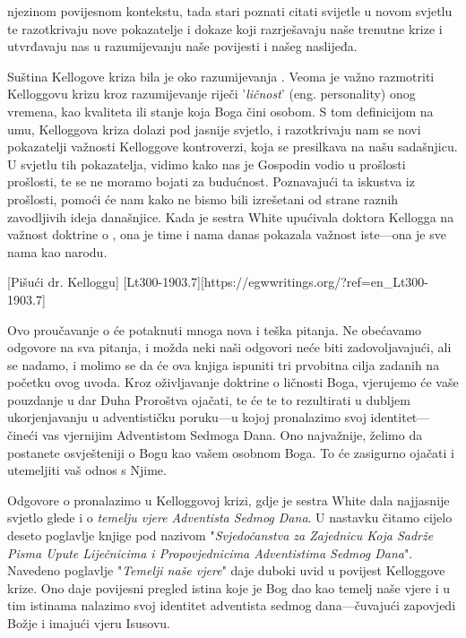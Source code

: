 njezinom povijesnom kontekstu, tada stari poznati citati svijetle u novom svjetlu te razotkrivaju nove pokazatelje i dokaze koji razrješavaju naše trenutne krize i utvrđavaju nas u razumijevanju naše povijesti i našeg naslijeđa.

Suština Kellogove kriza bila je oko razumijevanja . Veoma je važno razmotriti Kelloggovu krizu kroz razumijevanje riječi '\textit{ličnost}' (eng. personality) onog vremena, kao kvaliteta ili stanje koja Boga čini osobom. S tom definicijom na umu, Kelloggova kriza dolazi pod jasnije svjetlo, i razotkrivaju nam se novi pokazatelji važnosti Kelloggove kontroverzi, koja se presilkava na našu sadašnjicu. U svjetlu tih pokazatelja, vidimo kako nas je Gospodin vodio u prošlosti prošlosti, te se ne moramo bojati za budućnost. Poznavajući ta iskustva iz prošlosti, pomoći će nam kako ne bismo bili izrešetani od strane raznih zavodljivih ideja današnjice. Kada je sestra White upućivala doktora Kellogga na važnost doktrine o , ona je time i nama danas pokazala važnost iste—ona je sve nama kao narodu.

[Pišući dr. Kelloggu] [Lt300-1903.7][https://egwwritings.org/?ref=en\_Lt300-1903.7]

Ovo proučavanje o  će potaknuti mnoga nova i teška pitanja. Ne obećavamo odgovore na sva pitanja, i možda neki naši odgovori neće biti zadovoljavajući, ali se nadamo, i molimo se da će ova knjiga ispuniti tri prvobitna cilja zadanih na početku ovog uvoda. Kroz oživljavanje doktrine o ličnosti Boga, vjerujemo će vaše pouzdanje u dar Duha Proroštva ojačati, te će te to rezultirati u dubljem ukorjenjavanju u adventističku poruku—u kojoj pronalazimo svoj identitet—čineći vas vjernijim Adventistom Sedmoga Dana. Ono najvažnije, želimo da postanete osvješteniji o Bogu kao vašem osobnom Boga. To će zasigurno ojačati i utemeljiti vaš odnos s Njime.

Odgovore o  pronalazimo u Kelloggovoj krizi, gdje je sestra White dala najjasnije svjetlo glede  i o \textit{temelju vjere Adventista Sedmog Dana}. U nastavku čitamo cijelo deseto poglavlje knjige pod nazivom "\textit{Svjedočanstva za Zajednicu Koja Sadrže Pisma Upute Liječnicima i Propovjednicima Adventistima Sedmog Dana}". Navedeno poglavlje "\textit{Temelji naše vjere}" daje duboki uvid u povijest Kelloggove krize. Ono daje povijesni pregled istina koje je Bog dao kao temelj naše vjere i u tim istinama nalazimo svoj identitet adventista sedmog dana—čuvajući zapovjedi Božje i imajući vjeru Isusovu.
